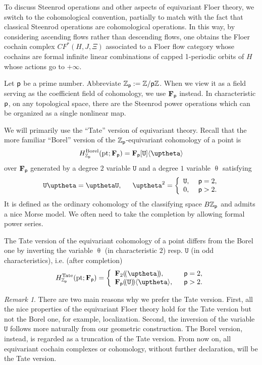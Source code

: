 \documentclass[reqno, 10pt]{amsart}
\numberwithin{equation}{section}
\numberwithin{equation}{section}
\theoremstyle{definition}
\theoremstyle{remark}
\newtheorem{rem}[thm]{Remark}
\newcommand{\beqn}{\begin{equation*}}
\newcommand{\eeqn}{\end{equation*}}
\newcommand{\mb}{\mathbb}
\newcommand{\p}{{\sf p}}
\newcommand{\fp}{{\bf F}_{\sf p}}
\newcommand{\zp}{{{\mb Z}_{\sf p}}}
\newcommand{\tu}{\mathtt{U}}
\newcommand{\lsu}{{(\!(\tu)\!)}}
\newcommand{\lst}{{(\!(\uptheta)\!)}}
\begin{document}
To discuss Steenrod operations and other aspects of equivariant Floer theory, we switch to the cohomological convention, partially to match with the fact that classical Steenrod operations are cohomological operations. In this way, by considering ascending flows rather than descending flows, one obtains the Floer cochain complex $CF^*(H, J, \Xi)$ associated to a Floer flow category whose cochains are formal infinite linear combinations of capped 1-periodic orbits of $H$ whose actions go to $+\infty$. 


Let $\p$ be a prime number. Abbreviate $\zp:= {\mb Z}/\p {\mb Z}$. When we view it as a field serving as the coefficient field of cohomology, we use $\fp$ instead. In characteristic $\p$, on any topological space, there are the Steenrod power operations which can be organized as a single nonlinear map. 

We will primarily use the ``Tate'' version of equivariant theory. Recall that the more familiar ``Borel'' version of the $\zp$-equivariant cohomology of a point is 
\beqn
H^{\rm Borel}_\zp ({\rm pt}; \fp) = \fp[\tu]\langle \uptheta\rangle
\eeqn
over $\fp$ generated by a degree $2$ variable $\tu$ and a degree $1$ variable $\uptheta$ satisfying 
\begin{align*}
&\ \tu\uptheta = \uptheta \tu,\ &\ \uptheta^2 = \left\{ \begin{array}{cc} \tu,\ & \p = 2,\\
                          0,\ & \p > 2. \end{array}\right.
\end{align*}
It is defined as the ordinary cohomology of the classifying space $B\zp$ and admits a nice Morse model. We often need to take the completion by allowing formal power series. 

The Tate version of the equivariant cohomology of a point differs from the Borel one by inverting the variable $\uptheta$ (in characteristic $2$) resp. $\tu$ (in odd characteristics), i.e. (after completion)
\beqn
H_{\zp}^{\rm Tate}({\rm pt}; \fp) = \left\{ \begin{array}{ll} {\bf F}_2 \lst,\ &\ \p = 2,\\
\fp \lsu \langle \uptheta \rangle,\ &\ \p > 2. \end{array}\right.
\eeqn

\begin{rem}
There are two main reasons why we prefer the Tate version. First, all the nice properties of the equivariant Floer theory hold for the Tate version but not the Borel one, for example, localization. Second, the inversion of the variable $\tu$ follows more naturally from our geometric construction. The Borel version, instead, is regarded as a truncation of the Tate version. From now on, all equivariant cochain complexes or cohomology, without further declaration, will be the Tate version. 
\end{rem}
\end{document}
